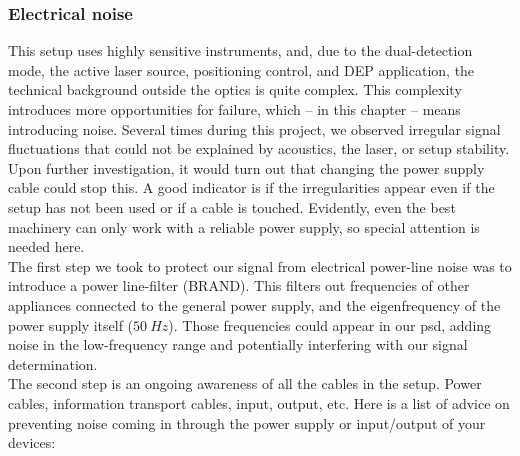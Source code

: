     \subsubsection{Electrical noise}
    \label{sec:electrical}
        This setup uses highly sensitive instruments, and, due to the dual-detection mode, the active laser source, positioning control, and \gls{DEP} application, the technical background outside the optics is quite complex. This complexity introduces more opportunities for failure, which -- in this chapter -- means introducing noise. Several times during this project, we observed irregular signal fluctuations that could not be explained by acoustics, the laser, or setup stability. Upon further investigation, it would turn out that changing the power supply cable could stop this. A good indicator is if the irregularities appear even if the setup has not been used or if a cable is touched. Evidently, even the best machinery can only work with a reliable power supply, so special attention is needed here. \\
        The first step we took to protect our signal from electrical power-line noise was to introduce a power line-filter (BRAND). This filters out frequencies of other appliances connected to the general power supply, and the eigenfrequency of the power supply itself ($50~Hz$). Those frequencies could appear in our \gls{psd}, adding noise in the low-frequency range and potentially interfering with our signal determination. \\
        The second step is an ongoing awareness of all the cables in the setup. Power cables, information transport cables, input, output, etc. Here is a list of advice on preventing noise coming in through the power supply or input/output of your devices: 
